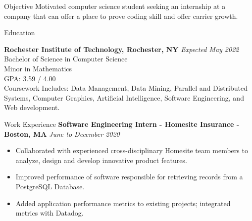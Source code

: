 \documentclass{resume} %
\begin{document}

\begin{rSection}{Objective}
Motivated computer science student seeking an internship at a company that can offer a 
place to prove coding skill and offer carrier growth.
\end{rSection}

\begin{rSection}{Education}

{\bf Rochester Institute of Technology, Rochester, NY} \hfill {\em Expected May 2022} 
\\ Bachelor of Science in Computer Science
\\ Minor in Mathematics
\\ GPA: 3.59 / 4.00
\\ Coursework Includes:  Data Management, Data Mining, Parallel and Distributed Systems, Computer Graphics, Artificial Intelligence, Software Engineering, and Web development.

\end{rSection}


\begin{rSection}{Work Experience} 
{\bf Software Engineering Intern - Homesite Insurance - Boston, MA} \hfill {\em June to December 2020}
\begin{itemize}[noitemsep]
    \item Collaborated with experienced cross-disciplinary Homesite team members to analyze, design and develop innovative product features.
    \item Improved performance of software responsible for retrieving records from a PostgreSQL Database. 
    \item Added application performance metrics to existing projects; integrated metrics with Datadog.
\end{itemize}
\end{rSection}
\end{document}
